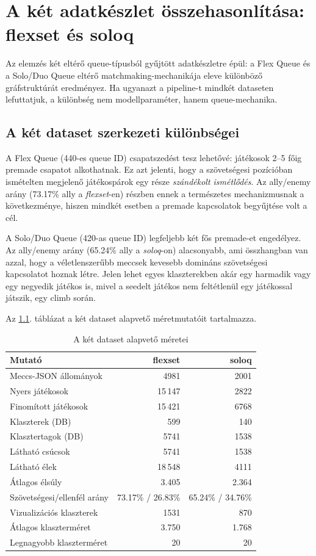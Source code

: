 \chapter{A két adatkészlet összehasonlítása: flexset és soloq}

Az elemzés két eltérő queue-típusból gyűjtött adatkészletre épül: a Flex Queue és a Solo/Duo Queue eltérő matchmaking-mechanikája eleve különböző gráfstruktúrát eredményez. Ha ugyanazt a pipeline-t mindkét dataseten lefuttatjuk, a különbség nem modellparaméter, hanem queue-mechanika.

\section{A két dataset szerkezeti különbségei}

A Flex Queue (440-es queue ID) csapatszedést tesz lehetővé: játékosok 2--5 főig premade csapatot alkothatnak. Ez azt jelenti, hogy a szövetségesi pozícióban ismételten megjelenő játékospárok egy része \emph{szándékolt ismétlődés}. Az ally/enemy arány (73.17\% ally a \textit{flexset}-en) részben ennek a természetes mechanizmusnak a következménye, hiszen mindkét esetben a premade kapcsolatok begyűjtése volt a cél.

A Solo/Duo Queue (420-as queue ID) legfeljebb két fős premade-et engedélyez. Az ally/enemy arány (65.24\% ally a \textit{soloq}-on) alacsonyabb, ami összhangban van azzal, hogy a véletlenszerűbb meccsek kevesebb domináns szövetségesi kapcsolatot hoznak létre. Jelen lehet egyes klaszterekben akár egy harmadik vagy egy negyedik játékos is, mivel a seedelt játékos nem feltétlenül egy játékossal játszik, egy climb során.

Az \ref{tab:dataset-sizes}. táblázat a két dataset alapvető méretmutatóit tartalmazza.
\begin{table}[H]
\centering
\caption{A két dataset alapvető méretei}
\label{tab:dataset-sizes}
\begin{tabularx}{\textwidth}{|>{\raggedright\arraybackslash}X|r|r|}
\hline
\textbf{Mutató} & \textbf{flexset} & \textbf{soloq} \\
\hline
Meccs-JSON állományok & 4981 & 2001 \\
Nyers játékosok & 15\,147 & 2822 \\
Finomított játékosok & 15\,421 & 6768 \\
Klaszterek (DB) & 599 & 140 \\
Klasztertagok (DB) & 5741 & 1538 \\
Látható csúcsok & 5741 & 1538 \\
Látható élek & 18\,548 & 4111 \\
Átlagos élsúly & 3.405 & 2.364 \\
Szövetségesi/ellenfél arány & 73.17\% / 26.83\% & 65.24\% / 34.76\% \\
Vizualizációs klaszterek & 1531 & 870 \\
Átlagos klaszterméret & 3.750 & 1.768 \\
Legnagyobb klaszterméret & 20 & 20 \\
\hline
\end{tabularx}
\end{table}

